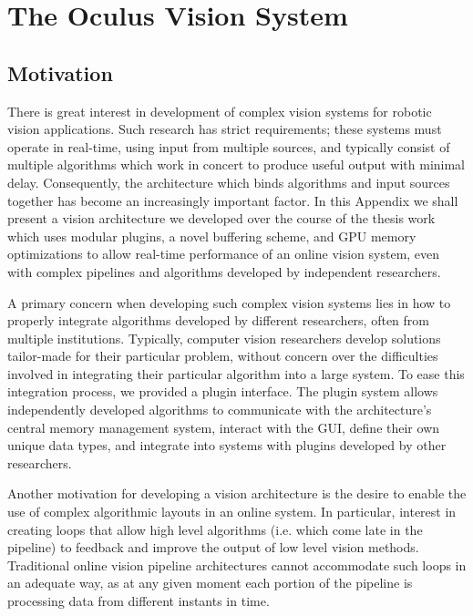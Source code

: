 \graphicspath{{figures/Oculus/}}

\chapter{The Oculus Vision System}
\section{Motivation}
There is great interest in development of complex vision systems for robotic vision applications. Such research has strict requirements; these systems must operate in real-time, using input from multiple sources, and typically consist of multiple algorithms which work in concert to produce useful output with minimal delay. Consequently, the architecture which binds algorithms and input sources together has become an increasingly important factor. In this Appendix we shall present a vision architecture we developed over the course of the thesis work which uses modular plugins, a novel buffering scheme, and GPU memory optimizations to allow real-time performance of an online vision system, even with complex pipelines and algorithms developed by independent researchers.

A primary concern when developing such complex vision systems lies in how to properly integrate algorithms developed by different researchers, often from multiple institutions. Typically, computer vision researchers develop solutions tailor-made for their particular problem, without concern over the difficulties involved in integrating their particular algorithm into a large system. To ease this integration process, we provided a plugin interface. The plugin system allows independently developed algorithms to communicate with the architecture's central memory management system, interact with the GUI, define their own unique data types, and integrate into systems with plugins developed by other researchers.

Another motivation for developing a vision architecture is the desire to enable the use of complex algorithmic layouts in an online system. In particular, interest in creating loops that allow high level algorithms (i.e. which come late in the pipeline) to feedback and improve the output of low level vision methods. Traditional online vision pipeline architectures cannot accommodate such loops in an adequate way, as at any given moment each portion of the pipeline is processing data from different instants in time. 

